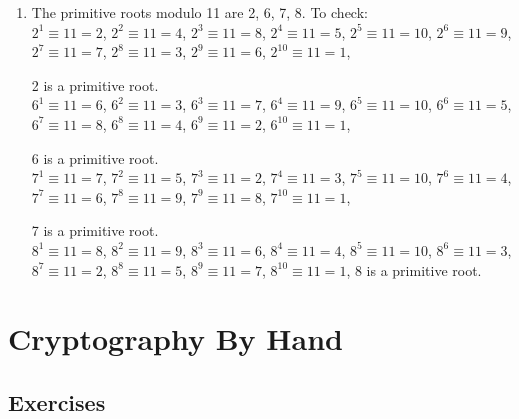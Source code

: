 {\begin{enumerate}
\begin{enumerate}[label=(\roman*)]
                        \(3\) is a primitive root.
              \end{enumerate}
        \item The primitive roots modulo 11 are 2, 6, 7, 8. To check: \\
              \(2^1 \equiv 11 = 2\), \(2^2 \equiv 11 = 4\), \(2^3 \equiv 11 = 8\), \(2^4 \equiv 11 = 5\), \(2^5 \equiv 11 = 10\), \(2^6 \equiv 11 = 9\), \(2^7 \equiv 11 = 7\), \(2^8 \equiv 11 = 3\), \(2^9 \equiv 11 = 6\), \(2^{10} \equiv 11 = 1\),

              2 is a primitive root. \\

              \(6^1 \equiv 11 = 6\), \(6^2 \equiv 11 = 3\), \(6^3 \equiv 11 = 7\), \(6^4 \equiv 11 = 9\), \(6^5 \equiv 11 = 10\), \(6^6 \equiv 11 = 5\), \(6^7 \equiv 11 = 8\), \(6^8 \equiv 11 = 4\), \(6^9 \equiv 11 = 2\), \(6^{10} \equiv 11 = 1\),

              6 is a primitive root. \\

              \(7^1 \equiv 11 = 7\), \(7^2 \equiv 11 = 5\), \(7^3 \equiv 11 = 2\), \(7^4 \equiv 11 = 3\), \(7^5 \equiv 11 = 10\), \(7^6 \equiv 11 = 4\), \(7^7 \equiv 11 = 6\), \(7^8 \equiv 11 = 9\), \(7^9 \equiv 11 = 8\), \(7^{10} \equiv 11 = 1\),

              7 is a primitive root. \\

              \(8^1 \equiv 11 = 8\), \(8^2 \equiv 11 = 9\), \(8^3 \equiv 11 = 6\), \(8^4 \equiv 11 = 4\), \(8^5 \equiv 11 = 10\), \(8^6 \equiv 11 = 3\), \(8^7 \equiv 11 = 2\), \(8^8 \equiv 11 = 5\), \(8^9 \equiv 11 = 7\), \(8^{10} \equiv 11 = 1\), 8 is a primitive root.
    \end{enumerate}
}
\renewcommand{\theenumi}{\arabic{enumi}}
\renewcommand{\labelenumi}{\theenumi.}
\section{Cryptography By Hand}

\renewcommand{\theenumi}{\alph{enumi}}
\renewcommand{\labelenumi}{(\theenumi)}
\subsection{Exercises}

